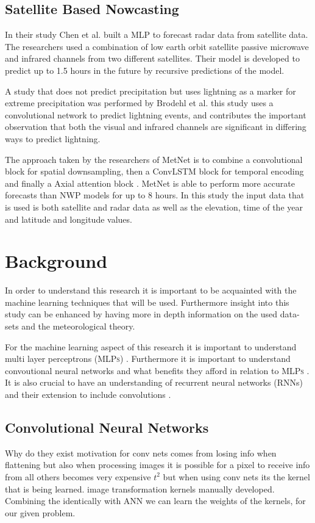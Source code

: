 \documentclass[acmtog, authorversion]{acmart}
\begin{document}
\subsection{Satellite Based Nowcasting}

In their study Chen et al. built a \cite{precipitationEstimationFromSat} MLP to forecast radar data from satellite data. The researchers used a combination of low earth orbit satellite passive microwave and infrared channels from two different satellites. Their model is developed to predict up to 1.5 hours in the future by recursive predictions of the model.
\medskip

A study that does not predict precipitation but uses lightning as a marker for extreme precipitation was performed by Brodehl et al. \cite{predictionLightning} this study uses a convolutional network to predict lightning events, and contributes the important observation that both the visual and infrared channels are significant in differing ways to predict lightning.
\medskip

The approach taken by the researchers of MetNet \cite{sønderby2020metnet} is to combine a convolutional block for spatial downsampling, then a ConvLSTM block for temporal encoding and finally a Axial attention block \cite{vaswani2017attention}. MetNet is able to perform more accurate forecasts than NWP models for up to 8 hours. In this study the input data that is used is both satellite and radar data as well as the elevation, time of the year and latitude and longitude values.

\section{Background}
In order to understand this research it is important to be acquainted with the machine learning techniques that will be used. Furthermore insight into this study can be enhanced by having more in depth information on the used data-sets and the meteorological theory.
\medskip

For the machine learning aspect of this research it is important to understand multi layer perceptrons (\textsc{MLPs}) \cite{schmidhuber2022annotated}. Furthermore it is important to understand convoutional neural networks and what benefits they afford in relation to \textsc{MLPs} \cite{oshea2015introduction}. It is also crucial to have an understanding of recurrent neural networks (RNNs) and their extension to include convolutions \cite{convlstm}.
\medskip

\subsection{Convolutional Neural Networks}
Why do they exist
motivation for conv nets comes from losing info when flattening but also when processing images it is possible for a pixel to
receive info from all others becomes very expensive $t^2$ but when using conv nets its the kernel that is being learned. image transformation kernels manually developed. Combining the identically
with ANN we can learn the weights of the kernels, for our given problem.
\end{document}
